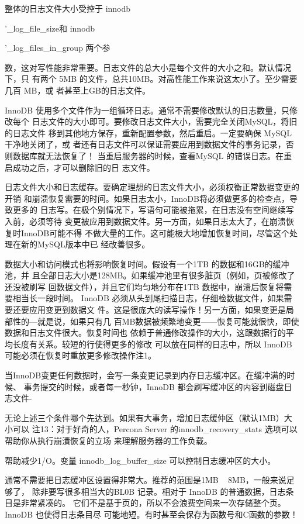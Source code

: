 整体的日志文件大小受控于 innodb

'\_log\_file\_size和 innodb

'\_log\_files\_in\_group 两个参

数，这对写性能非常重要。日志文件的总大小是每个文件的大小之和。默认情况下，只
有两个 5MB 的文件，总共10MB。对高性能工作来说这太小了。至少需要几百 MB，或
者甚至上GB的日志文件。

InnoDB 使用多个文件作为一组循环日志。通常不需要修改默认的日志数量，只修改每个
日志文件的大小即可。要修改日志文件大小，需要完全关闭MySQL，将旧的日志文件
移到其他地方保存，重新配置参数，然后重启。一定要确保 MySQL 干净地关闭了，或
者还有日志文件可以保证需要应用到数据文件的事务记录，否则数据库就无法恢复了！
当重启服务器的时候，查看MySQL 的错误日志。在重启成功之后，才可以删除旧的日
志文件。

日志文件大小和日志缓存。要确定理想的日志文件大小，必须权衡正常数据变更的开销
和崩溃恢复需要的时间。如果日志太小，InnoDB将必须做更多的检查点，导致更多的
日志写。在极个别情况下，写语句可能被拖累，在日志没有空间继续写入前，必须等待
变更被应用到数据文件。另一方面，如果日志太大了，在崩溃恢复时InnoDB可能不得
不做大量的工作。这可能极大地增加恢复时间，尽管这个处理在新的MySQL版本中已
经改善很多。

数据大小和访问模式也将影响恢复时间。假设有一个1TB 的数据和16GB的缓冲池，并
且全部日志大小是128MB。如果缓冲池里有很多脏页（例如，页被修改了还没被刷写
回数据文件），并且它们均匀地分布在1TB 数据中，崩溃后恢复将需要相当长一段时间。
InnoDB 必须从头到尾扫描日志，仔细检数据文件，如果需要还要应用变更到数据文
件。这是很庞大的读写操作！另一方面，如果变更是局部性的—就是说，如果只有几
百MB数据被频繁地变更——恢复可能就很快，即使数据和日志文件很大。恢复时间也
依赖于普通修改操作的大小，这跟数据行的平均长度有关系。较短的行使得更多的修改
可以放在同样的日志中，所以 InnoDB 可能必须在恢复时重放更多修改操作注1。

当InnoDB变更任何数据时，会写一条变更记录到内存日志缓冲区。在缓冲满的时候、
事务提交的时候，或者每一秒钟，InnoDB 都会刷写缓冲区的内容到磁盘日志文件-

无论上述三个条件哪个先达到。如果有大事务，增加日志缓仲区（默认1MB）大小可以
注13：对于好奇的人，Percona Server 的innodb\_recovery\_stats 选项可以帮助你从执行崩漬恢复的立场
来理解服务器的工作负载。

帮助减少1/O。变量 innodb\_log\_buffer\_size 可以控制日志缓冲区的大小。

通常不需要把日志缓冲区设置得非常大。推荐的范围是1MB ~ 8MB，一般来说足够了，
除非要写很多相当大的BL0B 记录。相对于 InnoDB 的普通数据，日志条目是非常紧凑的。
它们不是基于页的，所以不会浪费空间来一次存储整个页。InnoDB 也使得日志条目尽
可能地短。有时甚至会保存为函数号和C函数的参数！

